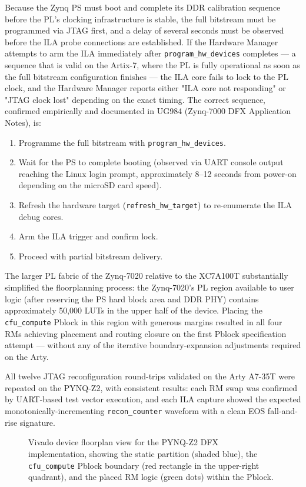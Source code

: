 Because the Zynq PS must boot and complete its DDR calibration sequence before the PL's clocking infrastructure is stable, the full bitstream must be programmed via JTAG first, and a delay of several seconds must be observed before the ILA probe connections are established. If the Hardware Manager attempts to arm the ILA immediately after \texttt{program\_hw\_devices} completes — a sequence that is valid on the Artix-7, where the PL is fully operational as soon as the full bitstream configuration finishes — the ILA core fails to lock to the PL clock, and the Hardware Manager reports either "ILA core not responding" or "JTAG clock lost" depending on the exact timing. The correct sequence, confirmed empirically and documented in UG984 (Zynq-7000 DFX Application Notes), is:

\begin{enumerate}
  \item Programme the full bitstream with \texttt{program\_hw\_devices}.
  \item Wait for the PS to complete booting (observed via UART console output reaching the Linux login prompt, approximately 8–12 seconds from power-on depending on the microSD card speed).
  \item Refresh the hardware target (\texttt{refresh\_hw\_target}) to re-enumerate the ILA debug cores.
  \item Arm the ILA trigger and confirm lock.
  \item Proceed with partial bitstream delivery.
\end{enumerate}
The larger PL fabric of the Zynq-7020 relative to the XC7A100T substantially simplified the floorplanning process: the Zynq-7020's PL region available to user logic (after reserving the PS hard block area and DDR PHY) contains approximately 50,000 LUTs in the upper half of the device. Placing the \texttt{cfu\_compute} Pblock in this region with generous margins resulted in all four RMs achieving placement and routing closure on the first Pblock specification attempt — without any of the iterative boundary-expansion adjustments required on the Arty.

All twelve JTAG reconfiguration round-trips validated on the Arty A7-35T were repeated on the PYNQ-Z2, with consistent results: each RM swap was confirmed by UART-based test vector execution, and each ILA capture showed the expected monotonically-incrementing \texttt{recon\_counter} waveform with a clean EOS fall-and-rise signature.

\begin{figure}[htbp]
\centering
{}
\caption{Vivado device floorplan view for the PYNQ-Z2 DFX implementation, showing the static partition (shaded blue), the \texttt{cfu\_compute} Pblock boundary (red rectangle in the upper-right quadrant), and the placed RM logic (green dots) within the Pblock.}
\end{figure}

